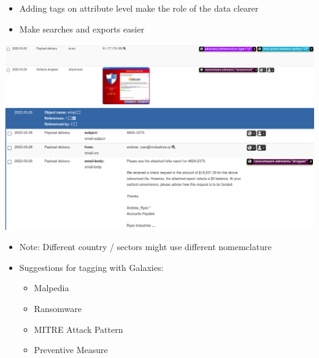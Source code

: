 \begin{frame}
    \begin{itemize}
        \item Adding tags on attribute level make the role of the data clearer
        \item Make searches and exports easier
    \end{itemize}
    \includegraphics[width=1.0\linewidth]{pictures/case2/attribute-tags2.png}
    \includegraphics[width=1.0\linewidth]{pictures/case2/attribute-tags3.png}
\end{frame}

\begin{frame}
    \begin{itemize}
        \item Note: Different country / sectors might use different nomemclature
        \item Suggestions for tagging with Galaxies:
        \begin{itemize}
            \item Malpedia
            \item Ransomware
            \item MITRE Attack Pattern
            \item Preventive Measure
        \end{itemize}
    \end{itemize}
\end{frame}

